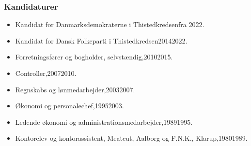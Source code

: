 \documentclass[11pt, a4paper]{awesome-cv}
\begin{document}
\begin{cvletter}
\subsubsection*{Kandidaturer}
\begin{itemize}
\item Kandidat for Danmarksdemokraterne i Thistedkredsenfra 2022.
\item Kandidat for Dansk Folkeparti i Thistedkredsen20142022.
\end{itemize}
\begin{itemize}
\item Forretningsfører og bogholder, selvstændig,20102015.
\item Controller,20072010.
\item Regnskabs og lønmedarbejder,20032007.
\item Økonomi og personalechef,19952003.
\item Ledende økonomi og administrationsmedarbejder,19891995.
\item Kontorelev og kontorassistent, Meatcut, Aalborg og F.N.K., Klarup,19801989.
\end{itemize}
\end{cvletter}
\end{document}
